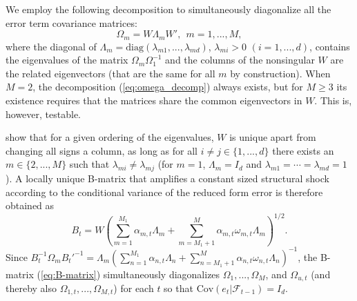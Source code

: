 \documentclass[nojss]{jss}
\begin{document}
We employ the following decomposition to simultaneously diagonalize all the error term covariance matrices:
\begin{equation}\label{eq:omega_decomp}
\Omega_m = W\Lambda_mW',  \ \ m=1,...,M,
\end{equation}
where the diagonal of $\Lambda_m = \text{diag}(\lambda_{m1},...,\lambda_{md})$,  $\lambda_{mi}>0$ $(i=1,...,d)$,  contains the eigenvalues of the matrix $\Omega_m\Omega_1^{-1}$ and the columns of the nonsingular $W$ are the related eigenvectors (that are the same for all $m$ by construction).  When $M=2$,  the decomposition (\ref{eq:omega_decomp}) always exists, but for $M\geq 3$ its existence requires that the matrices share the common eigenvectors in $W$.  This is, however, testable.

\citet[Proposition 1]{Lanne+Lutkepohl+Maciejowska:2010} show that for a given ordering of the eigenvalues, $W$ is unique apart from changing all signs a column, as long as for all $i\neq j\in \lbrace 1,...,d \rbrace$ there exists an $m\in\lbrace 2,...,M \rbrace$ such that $\lambda_{mi}\neq\lambda_{mj}$ (for $m=1$,  $\Lambda_m=I_d$ and $\lambda_{m1}=\cdots = \lambda_{md}=1$).  A locally unique B-matrix that amplifies a constant sized structural shock according to the conditional variance of the reduced form error is therefore obtained as
\begin{equation}\label{eq:B-matrix}
B_t = W(\sum_{m=1}^{M_1}\alpha_{m,t}\Lambda_m + \sum_{m=M_1 + 1}^{M}\alpha_{m,t}\omega_{m,t}\Lambda_m)^{1/2}.
\end{equation}
Since $B_t^{-1}\Omega_mB_t'^{-1}=\Lambda_m(\sum_{n=1}^{M_1}\alpha_{n,t}\Lambda_n + \sum_{n=M_1+1}^M\alpha_{n,t}\omega_{n,t}\Lambda_n)^{-1}$,  the B-matrix (\ref{eq:B-matrix}) simultaneously diagonalizes $\Omega_{1},...,\Omega_{M}$, and $\Omega_{u,t}$ (and thereby also $\Omega_{1,t},...,\Omega_{M,t}$) for each $t$ so that $\text{Cov}(e_t|\mathcal{F}_{t-1}) = I_d$.
\end{document}
